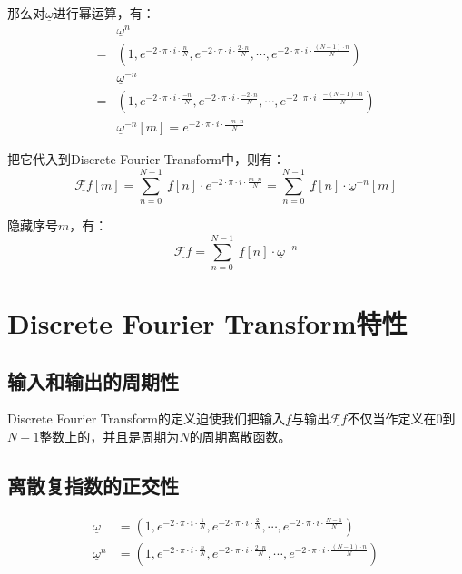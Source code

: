 那么对$\underline{\omega}$进行幂运算，有：
\begin{align*}
	  & \underline{\omega}^n                                                                                                                                 \\
	= & (1,e^{-2\cdot \pi\cdot i\cdot\frac{n}{N}},e^{-2\cdot \pi\cdot i\cdot\frac{2\cdot n}{N}},\cdots,e^{-2\cdot \pi\cdot i\cdot\frac{(N-1)\cdot n}{N}})    \\
	  & \underline{\omega}^{-n}                                                                                                                              \\
	= & (1,e^{-2\cdot \pi\cdot i\cdot\frac{-n}{N}},e^{-2\cdot \pi\cdot i\cdot\frac{-2\cdot n}{N}},\cdots,e^{-2\cdot \pi\cdot i\cdot\frac{-(N-1)\cdot n}{N}}) \\
	  & \underline{\omega}^{-n}[m] =  e^{-2\cdot \pi\cdot i\cdot\frac{-m\cdot n}{N}}
\end{align*}

把它代入到Discrete Fourier Transform中，则有：
$$
	\underline{\mathcal{F}f}[m]=\sum\limits_{n=0}^{N-1}\ \underline{f}[n]\cdot e^{-2\cdot \pi\cdot i\cdot\frac{m\cdot n}{N}}=\sum\limits_{n=0}^{N-1}\ \underline{f}[n]\cdot \underline{\omega}^{-n}[m]
$$

隐藏序号$m$，有：
\begin{equation}
	\underline{\mathcal{F}f}=\sum\limits_{n=0}^{N-1}\ \underline{f}[n]\cdot \underline{\omega}^{-n}
\end{equation}
\section{Discrete Fourier Transform特性}
\subsection{输入和输出的周期性}
Discrete Fourier Transform的定义迫使我们把输入$\underline{f}$与输出$\underline{\mathcal{F}f}$不仅当作定义在$0$到$N-1$整数上的，并且是周期为$N$的周期离散函数。


\subsection{离散复指数的正交性}
\begin{align*}
	\underline{\omega}   & =(1,e^{-2\cdot \pi\cdot i\cdot\frac{1}{N}},e^{-2\cdot \pi\cdot i\cdot\frac{2}{N}},\cdots,e^{-2\cdot \pi\cdot i\cdot\frac{N-1}{N}})                 \\
	\underline{\omega}^n & =(1,e^{-2\cdot \pi\cdot i\cdot\frac{n}{N}},e^{-2\cdot \pi\cdot i\cdot\frac{2\cdot n}{N}},\cdots,e^{-2\cdot \pi\cdot i\cdot\frac{(N-1)\cdot n}{N}}) \\
\end{align*}


